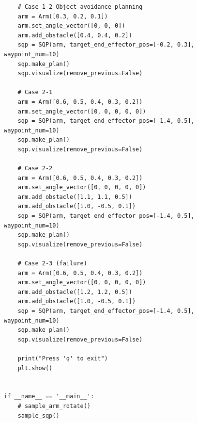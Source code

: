 \begin{verbatim}
    # Case 1-2 Object avoidance planning
    arm = Arm([0.3, 0.2, 0.1])
    arm.set_angle_vector([0, 0, 0])
    arm.add_obstacle([0.4, 0.4, 0.2])
    sqp = SQP(arm, target_end_effector_pos=[-0.2, 0.3], waypoint_num=10)
    sqp.make_plan()
    sqp.visualize(remove_previous=False)

    # Case 2-1
    arm = Arm([0.6, 0.5, 0.4, 0.3, 0.2])
    arm.set_angle_vector([0, 0, 0, 0, 0])
    sqp = SQP(arm, target_end_effector_pos=[-1.4, 0.5], waypoint_num=10)
    sqp.make_plan()
    sqp.visualize(remove_previous=False)

    # Case 2-2
    arm = Arm([0.6, 0.5, 0.4, 0.3, 0.2])
    arm.set_angle_vector([0, 0, 0, 0, 0])
    arm.add_obstacle([1.1, 1.1, 0.5])
    arm.add_obstacle([1.0, -0.5, 0.1])
    sqp = SQP(arm, target_end_effector_pos=[-1.4, 0.5], waypoint_num=10)
    sqp.make_plan()
    sqp.visualize(remove_previous=False)

    # Case 2-3 (failure)
    arm = Arm([0.6, 0.5, 0.4, 0.3, 0.2])
    arm.set_angle_vector([0, 0, 0, 0, 0])
    arm.add_obstacle([1.2, 1.2, 0.5])
    arm.add_obstacle([1.0, -0.5, 0.1])
    sqp = SQP(arm, target_end_effector_pos=[-1.4, 0.5], waypoint_num=10)
    sqp.make_plan()
    sqp.visualize(remove_previous=False)

    print("Press 'q' to exit")
    plt.show()


if __name__ == '__main__':
    # sample_arm_rotate()
    sample_sqp()
\end{verbatim}
